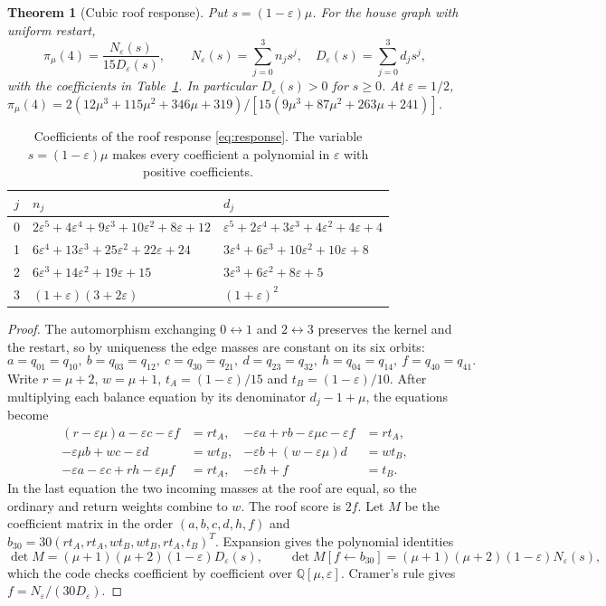\documentclass[11pt,a4paper]{article}
\newtheorem{theorem}{Theorem}[section]
\theoremstyle{definition}\newtheorem{conjecture}{Conjecture}
\theoremstyle{remark}\newtheorem{remark}[theorem]{Remark}
\newcommand{\eps}{\varepsilon}
\begin{document}
\begin{theorem}[Cubic roof response]\label{thm:response}
Put $s=(1-\eps)\mu$. For the house graph with uniform restart,
\begin{equation}\label{eq:response}
 \pi_\mu(4)=\frac{N_\eps(s)}{15D_\eps(s)},\qquad
 N_\eps(s)=\sum_{j=0}^3 n_js^j,\quad
 D_\eps(s)=\sum_{j=0}^3 d_js^j,
\end{equation}
with the coefficients in Table~\ref{tab:coeff}. In particular $D_\eps(s)>0$ for $s\geq0$. At $\eps=1/2$,
$\pi_\mu(4)=2(12\mu^3+115\mu^2+346\mu+319)/[15(9\mu^3+87\mu^2+263\mu+241)]$.
\end{theorem}

\begin{table}[htbp]
\centering\small
\caption{Coefficients of the roof response \eqref{eq:response}. The variable $s=(1-\eps)\mu$ makes every coefficient a polynomial in $\eps$ with positive coefficients.}\label{tab:coeff}
\begin{tabular}{@{}cll@{}}
\toprule
$j$ & $n_j$ & $d_j$\\
\midrule
0 & $2\eps^5+4\eps^4+9\eps^3+10\eps^2+8\eps+12$ & $\eps^5+2\eps^4+3\eps^3+4\eps^2+4\eps+4$\\
1 & $6\eps^4+13\eps^3+25\eps^2+22\eps+24$ & $3\eps^4+6\eps^3+10\eps^2+10\eps+8$\\
2 & $6\eps^3+14\eps^2+19\eps+15$ & $3\eps^3+6\eps^2+8\eps+5$\\
3 & $(1+\eps)(3+2\eps)$ & $(1+\eps)^2$\\
\bottomrule
\end{tabular}
\end{table}

\begin{proof}
The automorphism exchanging $0\leftrightarrow1$ and $2\leftrightarrow3$ preserves the kernel and the restart, so by uniqueness the edge masses are constant on its six orbits:
\[
 a=q_{01}=q_{10},\ b=q_{03}=q_{12},\ c=q_{30}=q_{21},\ d=q_{23}=q_{32},\ h=q_{04}=q_{14},\ f=q_{40}=q_{41}.
\]
Write $r=\mu+2$, $w=\mu+1$, $t_A=(1-\eps)/15$ and $t_B=(1-\eps)/10$. After multiplying each balance equation by its denominator $d_j-1+\mu$, the equations become
\begin{equation}\label{eq:quotient}
\begin{aligned}
 (r-\eps\mu)a-\eps c-\eps f&=rt_A, &
 -\eps a+rb-\eps\mu c-\eps f&=rt_A,\\
 -\eps\mu b+wc-\eps d&=wt_B, &
 -\eps b+(w-\eps\mu)d&=wt_B,\\
 -\eps a-\eps c+rh-\eps\mu f&=rt_A, &
 -\eps h+f&=t_B.
\end{aligned}
\end{equation}
In the last equation the two incoming masses at the roof are equal, so the ordinary and return weights combine to $w$. The roof score is $2f$. Let $M$ be the coefficient matrix in the order $(a,b,c,d,h,f)$ and $b_{30}=30(rt_A,rt_A,wt_B,wt_B,rt_A,t_B)^T$. Expansion gives the polynomial identities
\[
 \det M=(\mu+1)(\mu+2)(1-\eps)D_\eps(s),\qquad
 \det M[f\leftarrow b_{30}]=(\mu+1)(\mu+2)(1-\eps)N_\eps(s),
\]
which the code checks coefficient by coefficient over $\mathbb Q[\mu,\eps]$. Cramer's rule gives $f=N_\eps/(30D_\eps)$.
\end{proof}
\end{document}
